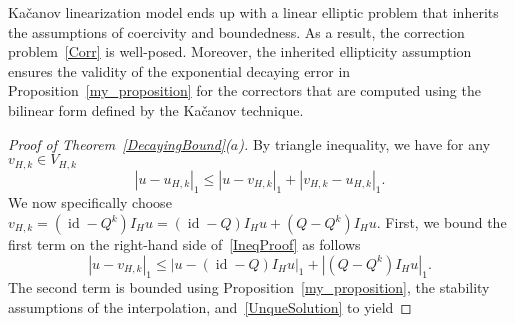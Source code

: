 \documentclass{article}
\begin{document}
Kačanov linearization model ends up with a linear elliptic problem that inherits the assumptions of coercivity and boundedness. As a result, the correction problem~\eqref{Corr} is well-posed. Moreover, the inherited ellipticity assumption ensures the validity of the exponential decaying error in Proposition~\ref{my_proposition} for the correctors that are computed using the bilinear form defined by the Kačanov technique.
\begin{proof}[Proof of Theorem~\ref{DecayingBound}($a$)] 
By triangle inequality, we have for any $v_{H,k}\in V_{H,k}$
\begin{equation}\label{IneqProof}
    |u-u_{H,k}|_1 \leq |u-v_{H,k}|_1+|v_{H,k}-u_{H,k}|_1.
\end{equation}
We now specifically choose $v_{H,k}=(\operatorname{id}-Q^k)I_Hu=(\operatorname{id}-Q)I_Hu+(Q-Q^k)I_Hu$.
First, we bound the first term on the right-hand side of~\eqref{IneqProof} as follows
\begin{equation}\label{Step1}
    |u-v_{H,k}|_1 \leq |u-(\operatorname{id}-Q)I_Hu|_1 +|(Q-Q^k)I_Hu|_1.
\end{equation}
The second term is bounded using Proposition~\ref{my_proposition}, the stability assumptions of the interpolation, and~\eqref{UnqueSolution} to yield


\end{proof}
\end{document}
